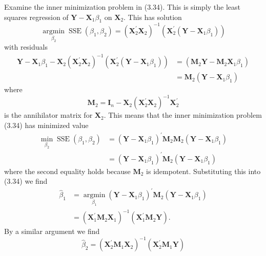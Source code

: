 \documentclass[10pt]{article}
\begin{document}
Examine the inner minimization problem in (3.34). This is simply the least squares regression of $\boldsymbol{Y}-\boldsymbol{X}_{1} \beta_{1}$ on $\boldsymbol{X}_{2}$. This has solution
$$
\underset{\beta_{2}}{\operatorname{argmin}} \operatorname{SSE}\left(\beta_{1}, \beta_{2}\right)=\left(\boldsymbol{X}_{2}^{\prime} \boldsymbol{X}_{2}\right)^{-1}\left(\boldsymbol{X}_{2}^{\prime}\left(\boldsymbol{Y}-\boldsymbol{X}_{1} \beta_{1}\right)\right)
$$
with residuals
$$
\begin{aligned}
\boldsymbol{Y}-\boldsymbol{X}_{1} \beta_{1}-\boldsymbol{X}_{2}\left(\boldsymbol{X}_{2}^{\prime} \boldsymbol{X}_{2}\right)^{-1}\left(\boldsymbol{X}_{2}^{\prime}\left(\boldsymbol{Y}-\boldsymbol{X}_{1} \beta_{1}\right)\right) &=\left(\boldsymbol{M}_{2} \boldsymbol{Y}-\boldsymbol{M}_{2} \boldsymbol{X}_{1} \beta_{1}\right) \\
&=\boldsymbol{M}_{2}\left(\boldsymbol{Y}-\boldsymbol{X}_{1} \beta_{1}\right)
\end{aligned}
$$
where
$$
\boldsymbol{M}_{2}=\boldsymbol{I}_{n}-\boldsymbol{X}_{2}\left(\boldsymbol{X}_{2}^{\prime} \boldsymbol{X}_{2}\right)^{-1} \boldsymbol{X}_{2}^{\prime}
$$
is the annihilator matrix for $\boldsymbol{X}_{2}$. This means that the inner minimization problem (3.34) has minimized value
$$
\begin{aligned}
\min _{\beta_{2}} \operatorname{SSE}\left(\beta_{1}, \beta_{2}\right) &=\left(\boldsymbol{Y}-\boldsymbol{X}_{1} \beta_{1}\right)^{\prime} \boldsymbol{M}_{2} \boldsymbol{M}_{2}\left(\boldsymbol{Y}-\boldsymbol{X}_{1} \beta_{1}\right) \\
&=\left(\boldsymbol{Y}-\boldsymbol{X}_{1} \beta_{1}\right)^{\prime} \boldsymbol{M}_{2}\left(\boldsymbol{Y}-\boldsymbol{X}_{1} \beta_{1}\right)
\end{aligned}
$$
where the second equality holds because $\boldsymbol{M}_{2}$ is idempotent. Substituting this into (3.34) we find
$$
\begin{aligned}
\widehat{\beta}_{1} &=\underset{\beta_{1}}{\operatorname{argmin}}\left(\boldsymbol{Y}-\boldsymbol{X}_{1} \beta_{1}\right)^{\prime} \boldsymbol{M}_{2}\left(\boldsymbol{Y}-\boldsymbol{X}_{1} \beta_{1}\right) \\
&=\left(\boldsymbol{X}_{1}^{\prime} \boldsymbol{M}_{2} \boldsymbol{X}_{1}\right)^{-1}\left(\boldsymbol{X}_{1}^{\prime} \boldsymbol{M}_{2} \boldsymbol{Y}\right) .
\end{aligned}
$$
By a similar argument we find
$$
\widehat{\beta}_{2}=\left(\boldsymbol{X}_{2}^{\prime} \boldsymbol{M}_{1} \boldsymbol{X}_{2}\right)^{-1}\left(\boldsymbol{X}_{2}^{\prime} \boldsymbol{M}_{1} \boldsymbol{Y}\right)
$$
\end{document}
